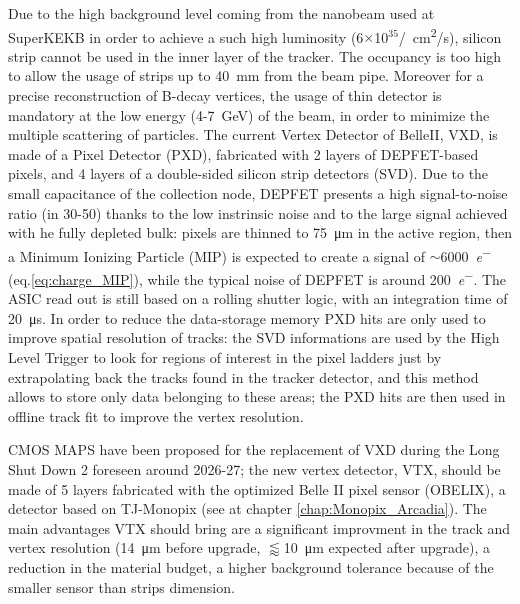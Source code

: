         Due to the high background level coming from the nanobeam used at SuperKEKB in order to achieve a such high luminosity (6$\times$10$^{35}$\si{/cm\squared/s}), silicon strip cannot be used in the inner layer of the tracker. The occupancy is too high to allow the usage of strips up to \SI{40}{mm} from the beam pipe. 
        Moreover for a precise reconstruction of B-decay vertices, the usage of thin detector is mandatory at the low energy (4-\SI{7}{GeV}) of the beam, in order to minimize the multiple scattering of particles. 
        The current Vertex Detector of BelleII, VXD, is made of a Pixel Detector (PXD), fabricated with 2 layers of DEPFET-based pixels, and 4 layers of a double-sided silicon strip detectors (SVD)\cite{BelleII-DEPFET}.
        Due to the small capacitance of the collection node, DEPFET presents a high signal-to-noise ratio (in 30-50) thanks to the low instrinsic noise and to the large signal achieved with he fully depleted bulk: pixels are thinned to \SI{75}{\um} in the active region, then a Minimum Ionizing Particle (MIP) is expected to create a signal of $\sim$\SI{6000}{\elementarycharge ^-} (eq.\ref{eq:charge_MIP}), while the typical noise of DEPFET is around \SI{200}{\elementarycharge ^-}.
        The ASIC read out is still based on a rolling shutter logic, with an integration time of \SI{20}{\us}.
        In order to reduce the data-storage memory PXD hits are only used to improve spatial resolution of tracks: the SVD informations are used by the High Level Trigger to look for regions of interest in the pixel ladders just by extrapolating back the tracks found in the tracker detector, and this method allows to store only data belonging to these areas; the PXD hits are then used in offline track fit to improve the vertex resolution.
        
        CMOS MAPS have been proposed for the replacement of VXD during the  Long Shut Down 2 foreseen around 2026-27; the new vertex detector, VTX, should be made of 5 layers fabricated with the optimized Belle II pixel sensor (OBELIX), a detector based on TJ-Monopix (see at chapter \ref{chap:Monopix_Arcadia}).    
        The main advantages VTX should bring are a significant improvment in the track and vertex resolution (\SI{14}{\um} before upgrade, $\lessapprox$\SI{10}{\um} expected after upgrade), a reduction in the material budget, a higher background tolerance because of the smaller sensor than strips dimension.

